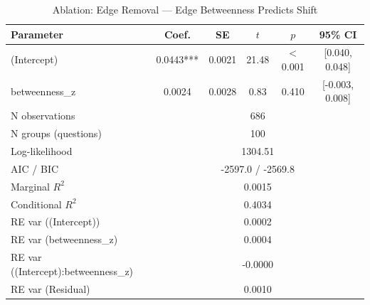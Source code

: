 \begin{table}[htbp]
\centering
\small
\caption{Ablation: Edge Removal --- Edge Betweenness Predicts Shift}
\label{tab:lme_ablation_edge_betw_table}
\begin{tabular}{lccccc}
\toprule
Parameter & Coef. & SE & $t$ & $p$ & 95\% CI \\
\midrule
  (Intercept) & 0.0443*** & 0.0021 & 21.48 & $<$0.001 & [0.040, 0.048] \\
  betweenness\_z & 0.0024 & 0.0028 & 0.83 & 0.410 & [-0.003, 0.008] \\
\midrule
  N observations & \multicolumn{5}{c}{686} \\
  N groups (questions) & \multicolumn{5}{c}{100} \\
  Log-likelihood & \multicolumn{5}{c}{1304.51} \\
  AIC / BIC & \multicolumn{5}{c}{-2597.0 / -2569.8} \\
  Marginal $R^2$ & \multicolumn{5}{c}{0.0015} \\
  Conditional $R^2$ & \multicolumn{5}{c}{0.4034} \\
  RE var ((Intercept)) & \multicolumn{5}{c}{0.0002} \\
  RE var (betweenness\_z) & \multicolumn{5}{c}{0.0004} \\
  RE var ((Intercept):betweenness\_z) & \multicolumn{5}{c}{-0.0000} \\
  RE var (Residual) & \multicolumn{5}{c}{0.0010} \\
\bottomrule
\end{tabular}
\end{table}
